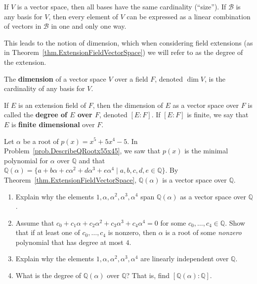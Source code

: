 \begin{fact}
If $V$ is a vector space, then all bases have the same cardinality (``size''). If $\mathcal{B}$ is any basis for $V$, then every element of $V$ can be expressed as a linear combination of vectors in $\mathcal{B}$ in one and only one way.
\end{fact}

This leads to the notion of dimension, which when considering field extensions (as in Theorem~\ref{thm.ExtensionFieldVectorSpace}) we will refer to as the degree of the extension.

\begin{definition}
The \textbf{dimension} of a vector space $V$ over a field $F$, denoted $\dim V$, is the cardinality of any basis for $V$. 
\end{definition}

\begin{definition}
If $E$ is an extension field of $F$, then the dimension of $E$ as a vector space over $F$ is called the \textbf{degree of $E$ over $F$}, denoted  $[E:F]$. If $[E:F]$ is finite, we say that $E$ is \textbf{finite dimensional} over $F$.
\end{definition}

\begin{problem}\label{prob.BasisQRootx55x45}
Let $\alpha$ be a root of $p(x) = x^5 + 5x^4 - 5$. In Problem~\ref{prob.DescribeQRootx55x45}, we saw that $p(x)$ is the minimal polynomial for $\alpha$ over $\mathbb{Q}$ and that $\mathbb{Q}(\alpha)= \{a + b\alpha + c\alpha^2 + d\alpha^3 + e\alpha^4\mid a,b,c,d,e\in \mathbb{Q}\}$. By Theorem~\ref{thm.ExtensionFieldVectorSpace}, $\mathbb{Q}(\alpha)$ is a vector space over $\mathbb{Q}$.
\begin{enumerate}
\item Explain why the elements $1,\alpha,\alpha^2,\alpha^3,\alpha^4$ span $\mathbb{Q}(\alpha)$ as a vector space over $\mathbb{Q}$.
\item Assume that $c_0+c_1\alpha+c_2\alpha^2+c_3\alpha^3+c_4\alpha^4 = 0$ for some $c_0,\ldots,c_4\in \mathbb{Q}$. Show that if at least one of  $c_0,\ldots,c_4$ is nonzero, then $\alpha$ is a root of some \emph{nonzero} polynomial that has degree at most $4$. 
\item Explain why the elements $1,\alpha,\alpha^2,\alpha^3,\alpha^4$ are linearly independent over $\mathbb{Q}$.
\item What is the degree of $\mathbb{Q}(\alpha)$ over $\mathbb{Q}$? That is, find $[\mathbb{Q}(\alpha):\mathbb{Q}]$.
\end{enumerate}
\end{problem}


